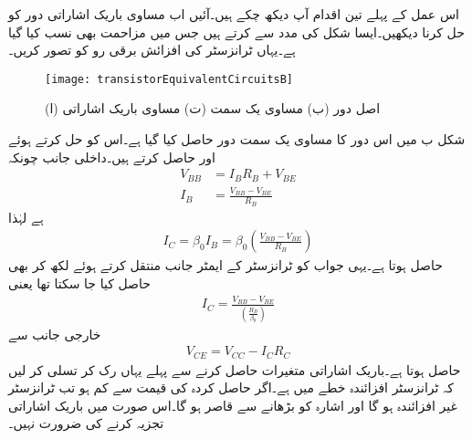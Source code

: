 اس عمل کے پہلے تین اقدام آپ دیکھ چکے ہیں۔آئیں اب مساوی باریک اشاراتی دور کو حل کرنا دیکھیں۔ایسا شکل   کی مدد سے کرتے ہیں جس میں مزاحمت  بھی نسب کیا گیا ہے۔یہاں ٹرانزسٹر کی افزائش برقی رو کو  تصور کریں۔

\begin{figure}
\centering
\texttt{[image: transistorEquivalentCircuitsB]}
\caption{ (ا) اصل دور (ب) مساوی یک سمت (ت) مساوی باریک اشاراتی}
\label{شکل_ٹرانزسٹر_کے_مساوی_ادوار_ب}
\end{figure}
شکل  ب میں اس دور کا مساوی یک سمت دور حاصل کیا گیا ہے۔اس کو حل کرتے ہوئے  اور   حاصل کرتے ہیں۔داخلی جانب چونکہ
\begin{align*}
V_{BB}&=I_B R_B + V_{BE}\\
I_B&=\frac{V_{BB}-V_{BE}}{R_B}
\end{align*}
ہے لہٰذا
\begin{align}
I_C = \beta_0 I_B = \beta_0 \left (\frac{V_{BB}-V_{BE}}{R_B} \right )
\end{align}
حاصل ہوتا ہے۔یہی جواب  کو ٹرانزسٹر کے ایمٹر جانب منتقل کرتے ہوئے  لکھ کر بھی حاصل کیا جا سکتا تھا یعنی
\begin{align*}
I_C=\frac{V_{BB}-V_{BE}}{\left(\frac{R_B}{\beta_0} \right )}
\end{align*}
خارجی جانب سے
\begin{align}
V_{CE}=V_{CC}-I_C R_C
\end{align}
حاصل ہوتا ہے۔باریک اشاراتی متغیرات حاصل کرنے سے پہلے یہاں رک کر تسلی کر لیں کہ ٹرانزسٹر افزائندہ خطے میں ہے۔اگر حاصل کردہ  کی قیمت  سے کم ہو تب ٹرانزسٹر غیر افزائندہ ہو گا اور اشارہ کو بڑھانے سے قاصر ہو گا۔اس صورت میں باریک اشاراتی تجزیہ کرنے کی ضرورت نہیں۔

